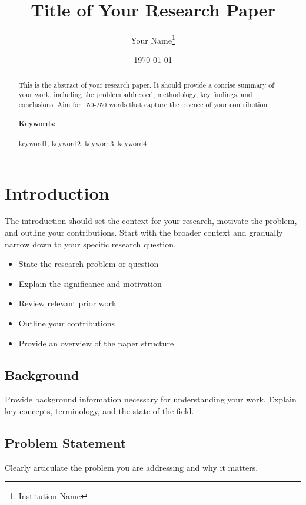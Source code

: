 \documentclass[11pt,a4paper]{article}
\title{Title of Your Research Paper}
\author{Your Name\thanks{Institution Name}}
\date{\today}
\theoremstyle{definition}
\begin{document}
\maketitle

\begin{abstract}
This is the abstract of your research paper. It should provide a concise summary of your work, including the problem addressed, methodology, key findings, and conclusions. Aim for 150-250 words that capture the essence of your contribution.
\paragraph{Keywords:} keyword1, keyword2, keyword3, keyword4
\end{abstract}

\section{Introduction}

The introduction should set the context for your research, motivate the problem, and outline your contributions. Start with the broader context and gradually narrow down to your specific research question.

\begin{itemize}
    \item State the research problem or question
    \item Explain the significance and motivation
    \item Review relevant prior work
    \item Outline your contributions
    \item Provide an overview of the paper structure
\end{itemize}

\subsection{Background}

Provide background information necessary for understanding your work. Explain key concepts, terminology, and the state of the field.

\subsection{Problem Statement}

Clearly articulate the problem you are addressing and why it matters.
\end{document}
